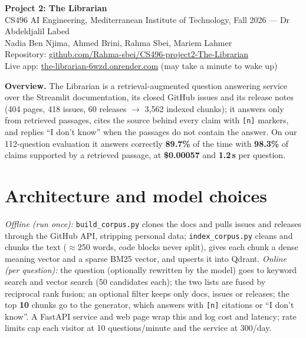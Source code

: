\documentclass[10pt]{article}
\begin{document}
\begin{center}
  {\large\bfseries Project 2: The Librarian}\\[2pt]
  CS496 AI Engineering, Mediterranean Institute of Technology, Fall 2026 --- Dr Abdeldjalil Labed\\
  Nadia Ben Njima, Ahmed Brini, Rahma Sbei, Mariem Lahmer\\
  Repository: \href{https://github.com/Rahma-sbei/CS496-project2-The-Librarian}{github.com/Rahma-sbei/CS496-project2-The-Librarian}\\
  Live app: \href{https://the-librarian-6wzd.onrender.com}{the-librarian-6wzd.onrender.com} (may take a minute to wake up)
\end{center}

\noindent\textbf{Overview.} The Librarian is a retrieval-augmented question answering service over the Streamlit
documentation, its closed GitHub issues and its release notes (404 pages, 418 issues, 60 releases $\rightarrow$ 3{,}562
indexed chunks); it answers only from retrieved passages, cites the source behind every claim with \texttt{[n]} markers, and
replies ``I don't know'' when the passages do not contain the answer. On our 112-question evaluation it answers correctly
\textbf{89.7\%} of the time with \textbf{98.3\%} of claims supported by a retrieved passage, at \textbf{\$0.00057} and
\textbf{1.2\,s} per question.

\section{Architecture and model choices}

\textit{Offline (run once):} \texttt{build\_corpus.py} clones the docs and pulls issues and releases through the GitHub API,
stripping personal data; \texttt{index\_corpus.py} cleans and chunks the text ($\approx$250 words, code blocks never split),
gives each chunk a dense meaning vector and a sparse BM25 vector, and upserts it into Qdrant.
\textit{Online (per question):} the question (optionally rewritten by the model) goes to keyword search and vector search
(50 candidates each); the two lists are fused by reciprocal rank fusion; an optional filter keeps only docs, issues or
releases; the top \textbf{10} chunks go to the generator, which answers with \texttt{[n]} citations or ``I don't know''.
A FastAPI service and web page wrap this and log cost and latency; rate limits cap each visitor at 10 questions/minute and
the service at 300/day.
\end{document}
